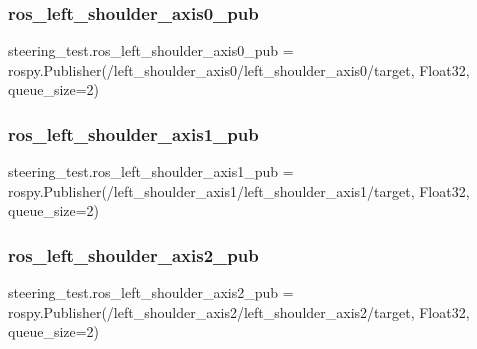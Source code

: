\mbox{\label{namespacesteering__test_ae45c5456e93c7c274ef55e0430768eac}} 
\subsubsection{\texorpdfstring{ros\_left\_shoulder\_axis0\_pub}{ros\_left\_shoulder\_axis0\_pub}}
{\footnotesize\ttfamily steering\+\_\+test.\+ros\+\_\+left\+\_\+shoulder\+\_\+axis0\+\_\+pub = rospy.\+Publisher(\textquotesingle{}/left\+\_\+shoulder\+\_\+axis0/left\+\_\+shoulder\+\_\+axis0/target\textquotesingle{}, Float32, queue\+\_\+size=2)}

\mbox{\label{namespacesteering__test_a736f11c141c4261badff3b3d5508e14a}} 
\subsubsection{\texorpdfstring{ros\_left\_shoulder\_axis1\_pub}{ros\_left\_shoulder\_axis1\_pub}}
{\footnotesize\ttfamily steering\+\_\+test.\+ros\+\_\+left\+\_\+shoulder\+\_\+axis1\+\_\+pub = rospy.\+Publisher(\textquotesingle{}/left\+\_\+shoulder\+\_\+axis1/left\+\_\+shoulder\+\_\+axis1/target\textquotesingle{}, Float32, queue\+\_\+size=2)}

\mbox{\label{namespacesteering__test_ad1539c0499eb48f16aa4670176c5d2cd}} 
\subsubsection{\texorpdfstring{ros\_left\_shoulder\_axis2\_pub}{ros\_left\_shoulder\_axis2\_pub}}
{\footnotesize\ttfamily steering\+\_\+test.\+ros\+\_\+left\+\_\+shoulder\+\_\+axis2\+\_\+pub = rospy.\+Publisher(\textquotesingle{}/left\+\_\+shoulder\+\_\+axis2/left\+\_\+shoulder\+\_\+axis2/target\textquotesingle{}, Float32, queue\+\_\+size=2)}


